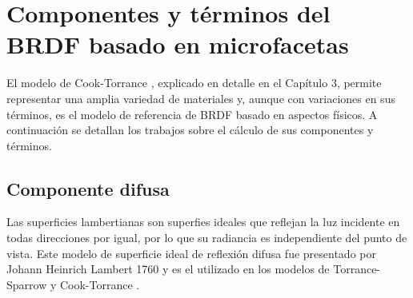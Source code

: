 
    \section{Componentes y t\'erminos del BRDF basado en microfacetas}
    El modelo de Cook-Torrance \autocite{cooktorrance}, explicado en detalle en el Cap\'itulo 3, permite representar una amplia
    variedad de materiales y, aunque con variaciones en sus t\'erminos, es el modelo de referencia de BRDF basado en aspectos f\'isicos.
    A continuaci\'on se detallan los trabajos sobre el c\'alculo de sus componentes y t\'erminos.


        \subsection{Componente difusa}
            Las superficies lambertianas son superfies ideales que reflejan la luz incidente en todas direcciones por igual, por lo
            que su radiancia es independiente del punto de vista. Este modelo de superficie ideal de reflexi\'on difusa fue presentado
            por Johann Heinrich Lambert 1760 \autocite{lambert} y es el utilizado en los modelos de Torrance-Sparrow \autocite{torrancesparrow}
            y Cook-Torrance \autocite{cooktorrance}.\\

